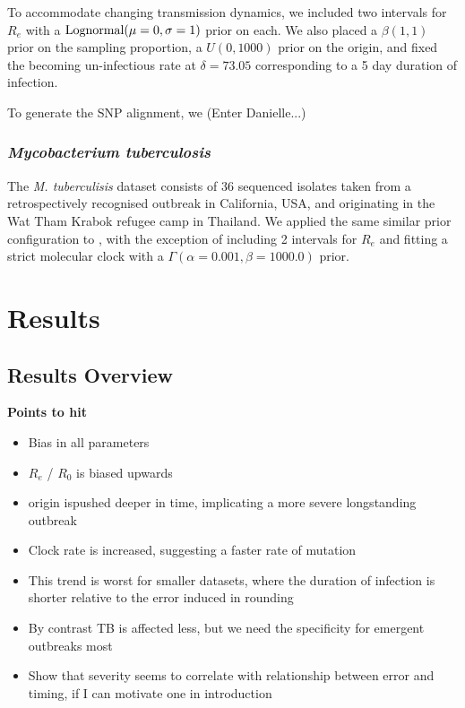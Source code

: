 \documentclass{article}
\begin{document}
\begin{spacing}{1.5}
To accommodate changing transmission dynamics, we included two intervals for $R_e$ with a $\textnormal{Lognormal}(\mu=0,\sigma=1)$ prior on each. We also placed a $\beta(1,1)$ prior on the sampling proportion, a $U(0,1000)$ prior on the origin, and fixed the becoming un-infectious rate at $\delta=73.05$ corresponding to a 5 day duration of infection.

To generate the SNP alignment, we (Enter Danielle...)

\subsubsection*{\textit{Mycobacterium tuberculosis}}
The \textit{M. tuberculisis} dataset consists of 36 sequenced isolates taken from a retrospectively recognised outbreak in California, USA, and originating in the Wat Tham Krabok refugee camp in Thailand. We applied the same similar prior configuration to \citet{kuhnert_tuberculosis_2018}, with the exception of including 2 intervals for $R_e$ and fitting a strict molecular clock with a $\Gamma(\alpha=0.001,\beta=1000.0)$ prior.


\section*{Results}
\subsection*{Results Overview}
\textbf{Points to hit}
\begin{itemize}
    \item Bias in all parameters
    \item $R_e$ / $R_0$ is biased upwards
    \item origin ispushed deeper in time, implicating a more severe longstanding outbreak
    \item Clock rate is increased, suggesting a faster rate of mutation
    \item This trend is worst for smaller datasets, where the duration of infection is shorter relative to the error induced in rounding
    \item By contrast TB is affected less, but we need the specificity for emergent outbreaks most
    \item Show that severity seems to correlate with relationship between error and timing, if I can motivate one in introduction
\end{itemize}


\end{spacing}
\end{document}
